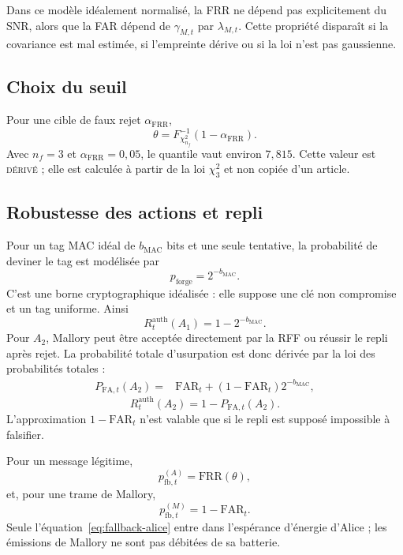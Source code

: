 \documentclass[conference,a4paper]{IEEEtran}
\newcommand{\statusDer}{\textsc{dérivé}}
\newcommand{\Rauth}{R^{\mathrm{auth}}}
\newcommand{\FAR}{\mathrm{FAR}}
\newcommand{\FRR}{\mathrm{FRR}}
\begin{document}
Dans ce modèle idéalement normalisé, la FRR ne dépend pas explicitement du SNR, alors que la FAR dépend de $\gamma_{M,t}$ par $\lambda_{M,t}$. Cette propriété disparaît si la covariance est mal estimée, si l'empreinte dérive ou si la loi n'est pas gaussienne.

\subsection{Choix du seuil}
Pour une cible de faux rejet $\alpha_{\mathrm{FRR}}$,
\begin{equation}
    \theta=F^{-1}_{\chi^2_{n_f}}(1-\alpha_{\mathrm{FRR}}).
    \label{eq:rff-threshold}
\end{equation}
Avec $n_f=3$ et $\alpha_{\mathrm{FRR}}=0{,}05$, le quantile vaut environ $7{,}815$. Cette valeur est \statusDer{} ; elle est calculée à partir de la loi $\chi^2_3$ et non copiée d'un article.

\subsection{Robustesse des actions et repli}
Pour un tag MAC idéal de $b_{\mathrm{MAC}}$ bits et une seule tentative, la probabilité de deviner le tag est modélisée par
\begin{equation}
    p_{\mathrm{forge}}=2^{-b_{\mathrm{MAC}}}.
\end{equation}
C'est une borne cryptographique idéalisée : elle suppose une clé non compromise et un tag uniforme. Ainsi
\begin{equation}
    \Rauth_t(A_1)=1-2^{-b_{\mathrm{MAC}}}.
\label{eq:rauth-a1}
\end{equation}
Pour $A_2$, Mallory peut être acceptée directement par la RFF ou réussir le repli après rejet. La probabilité totale d'usurpation est donc dérivée par la loi des probabilités totales :
\begin{equation}
\begin{split}
P_{\mathrm{FA},t}(A_2)={}&\FAR_t+
(1-\FAR_t)2^{-b_{\mathrm{MAC}}},
\end{split}
\label{eq:a2-total-far}
\end{equation}
\begin{equation}
    \Rauth_t(A_2)=1-P_{\mathrm{FA},t}(A_2).
    \label{eq:rauth-a2}
\end{equation}
L'approximation $1-\FAR_t$ n'est valable que si le repli est supposé impossible à falsifier.

Pour un message légitime,
\begin{equation}
    p_{\mathrm{fb},t}^{(A)}=\FRR(\theta),
    \label{eq:fallback-alice}
\end{equation}
et, pour une trame de Mallory,
\begin{equation}
    p_{\mathrm{fb},t}^{(M)}=1-\FAR_t.
    \label{eq:fallback-mallory}
\end{equation}
Seule l'équation~\eqref{eq:fallback-alice} entre dans l'espérance d'énergie d'Alice ; les émissions de Mallory ne sont pas débitées de sa batterie.
\end{document}
